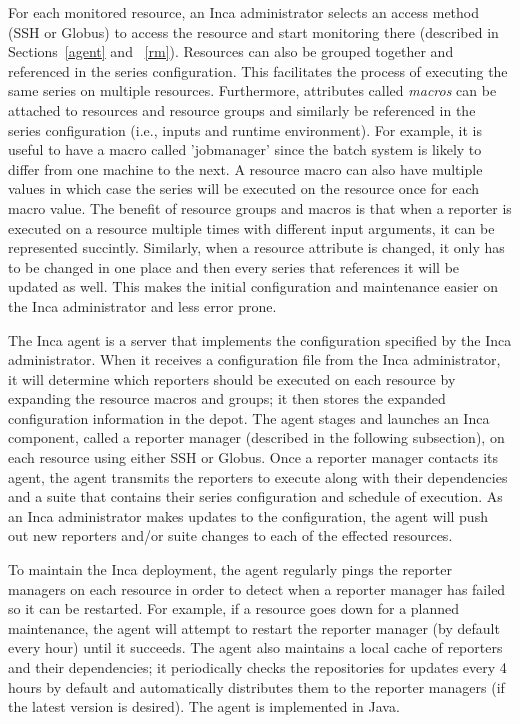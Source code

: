 \documentclass[times,10pt,twocolumn]{article}
\begin{document}
For each monitored resource, an Inca administrator selects an access method
(SSH or Globus) to access the resource and start monitoring there (described
in Sections~\ref{agent} and ~\ref{rm}).  Resources can also be grouped
together and referenced in the series configuration.  This facilitates the
process of executing the same series on multiple resources.  Furthermore,
attributes called \emph{macros} can be attached to resources and resource
groups and similarly be referenced in the series configuration (i.e., inputs
and runtime environment).  For example, it is useful to have a macro called
'jobmanager' since the batch system is likely to differ from one machine to
the next.  A resource macro can also have multiple values in which case the
series will be executed on the resource once for each macro value.  The
benefit of resource groups and macros is that when a reporter is executed on a
resource multiple times with different input arguments, it can be represented
succintly.  Similarly, when a resource attribute is changed, it only has to be
changed in one place and then every series that references it will be updated
as well.  This makes the initial configuration and maintenance easier on the
Inca administrator and less error prone.


The Inca agent is a server that implements the configuration specified by the
Inca administrator.  When it receives a configuration file from the Inca
administrator, it will determine which reporters should be executed on each
resource by expanding the resource macros and groups; it then stores the
expanded configuration information in the depot.  The agent stages and
launches an Inca component, called a reporter manager (described in the
following subsection), on each resource using either SSH or Globus.  Once a
reporter manager contacts its agent, the agent transmits the reporters to
execute along with their dependencies and a suite that contains their series
configuration and schedule of execution.  As an Inca administrator makes
updates to the configuration, the agent will push out new reporters and/or
suite changes to each of the effected resources.

To maintain the Inca deployment, the agent regularly pings the reporter
managers on each resource in order to detect when a reporter manager has
failed so it can be restarted.  For example, if a resource goes down for a
planned maintenance, the agent will attempt to restart the reporter manager
(by default every hour) until it succeeds.  The agent also maintains a local
cache of reporters and their dependencies; it periodically checks the
repositories for updates every 4 hours by default and automatically
distributes them to the reporter managers (if the latest version is desired).  
The agent is implemented in Java. 
\end{document}
